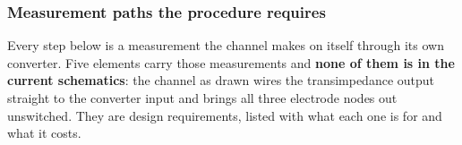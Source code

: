 
\subsubsection{Measurement paths the procedure requires}
\label{sss:calibration-paths}

Every step below is a measurement the channel makes on itself through its own
converter. Five elements carry those measurements and \textbf{none of them is in
the current schematics}: the channel as drawn wires the transimpedance output
straight to the converter input and brings all three electrode nodes out
unswitched. They are design requirements, listed with what each one is for and
what it costs.

